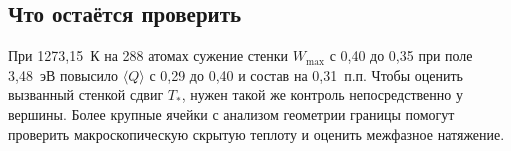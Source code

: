 \subsection*{Что остаётся проверить}
При 1273,15~К на 288 атомах сужение стенки \(W_{\max}\) с 0,40 до 0,35 при поле 3,48~эВ повысило \(\langle Q\rangle\) с 0,29 до 0,40 и состав на 0,31~п.п. Чтобы оценить вызванный стенкой сдвиг \(T_*\), нужен такой же контроль непосредственно у вершины. Более крупные ячейки с анализом геометрии границы помогут проверить макроскопическую скрытую теплоту и оценить межфазное натяжение.
